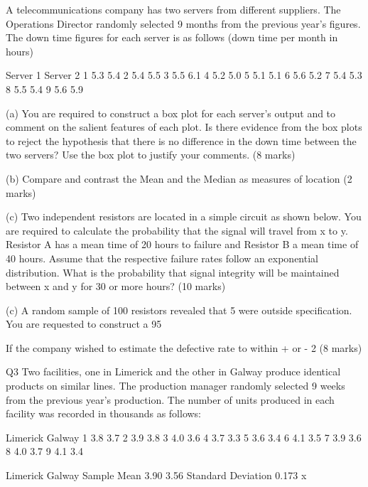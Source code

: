 \documentclass[]{report}
\begin{document}
\begin{enumerate}[(i)]
A telecommunications company has two servers from different suppliers. The Operations Director randomly selected 9 months from the previous year’s figures.  The down time figures for each server is as follows (down time per month in hours)


Server 1	Server 2
1	5.3	5.4
2	5.4	5.5
3	5.5	6.1
4	5.2	5.0
5	5.1	5.1
6	5.6	5.2
7	5.4	5.3
8	5.5	5.4
9	5.6	5.9


(a)	You are required to construct a box plot for each server’s output and to comment on the salient features of each plot.  Is there evidence from the box plots to reject the hypothesis that there is no difference in the down time between the two servers?  Use the box plot to justify your comments. 							(8 marks)

(b)	Compare and contrast the Mean and the Median as measures of location
(2 marks)

(c)	Two independent resistors are located in a simple circuit as shown below.  You are required to calculate the probability that the signal will travel from x to y.  Resistor A has a mean time of 20 hours to failure and Resistor B a mean time of 40 hours.  Assume that the respective failure rates follow an exponential distribution.  What is the probability that signal integrity will be maintained between x and y for 30 or more hours?
(10 marks)





(c)	A random sample of 100 resistors revealed that 5 were outside specification.  You are requested to construct a 95%

If the company wished to estimate the defective rate to within + or - 2%
(8 marks)




Q3
Two facilities, one in Limerick and the other in Galway produce identical products on similar lines.  The production manager randomly selected 9 weeks from the previous year’s production.  The number of units produced in each facility was recorded in thousands as follows:

Limerick	Galway
1	3.8	3.7
2	3.9	3.8
3	4.0	3.6
4	3.7	3.3
5	3.6	3.4
6	4.1	3.5
7	3.9	3.6
8	4.0	3.7
9	4.1	3.4



Limerick	Galway
Sample Mean	3.90	3.56
Standard Deviation	0.173	x


\end{enumerate}
\end{document}
